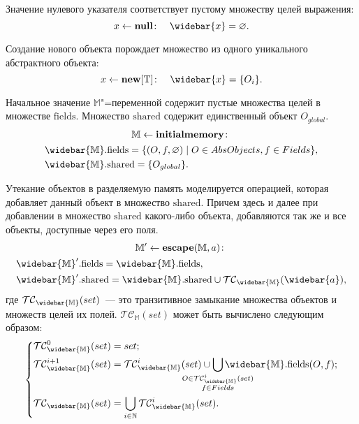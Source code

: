 \documentclass[14pt,titlepage,draft]{extarticle}
\newcommand{\M}{\ensuremath{\mathbb{M}}}
\newcommand{\Ms}{\ensuremath{\mathbb{\widebar{M}}}}
\newcommand{\Mf}[1]{\ensuremath{\mathrm{#1}}}
\newcommand{\type}[1]{\mathrm{#1}}
\newcommand{\op}[1]{\mathbf{#1}}
\newcommand{\pts}[1]{\widebar{#1}}
\newcommand{\AO}{O}
\newcommand{\AOGlobal}{\AO_{global}}
\newcommand{\TClosure}{\mathcal{TC}}
\begin{document}
    Значение нулевого указателя соответствует пустому множеству целей
    выражения:
    \[
      x \gets \op{null} \colon \quad
      \pts{x} = \emptyset.
    \]

    Создание нового объекта порождает множество из одного уникального
    абстрактного объекта:
    \[
      x \gets \op{new}[\type{T}] \colon \quad
      \pts{x} = \{\AO_i\}.
    \]

    Начальное значение \M"=переменной содержит пустые множества целей в
    множестве \Mf{fields}. Множество \Mf{shared}
    содержит единственный объект $\AOGlobal$.
    \begin{gather*}
      \M \gets \op{initialmemory} \colon \\
      \begin{aligned}
        &\Ms.\Mf{fields} = \{ (\AO, f, \emptyset) \mid
          \AO \in AbsObjects, f \in Fields \}, \\
        &\Ms.\Mf{shared} = \{\AOGlobal\}.
      \end{aligned}
    \end{gather*}

    Утекание объектов в разделяемую память моделируется операцией, которая
    добавляет данный объект в множество \Mf{shared}. Причем здесь и далее
    при добавлении в множество \Mf{shared} какого-либо объекта, добавляются
    так же и все объекты, доступные через его поля.
    \begin{gather*}
      \M' \gets \op{escape}(\M, a) \colon \\
      \begin{aligned}
        &\Ms'.\Mf{fields} = \Ms.\Mf{fields}, \\
        &\Ms'.\Mf{shared} = \Ms.\Mf{shared} \cup \TClosure_\Ms(\pts{a}),
      \end{aligned}
    \end{gather*}
    где $\TClosure_\Ms(set)$~--- это транзитивное замыкание  множества объектов и множеств целей их полей.
    $\TClosure_\M(set)$ может быть вычислено следующим образом:
    \[\left\{\begin{aligned}
      &\TClosure_\Ms^0(set) = set; \\
      &\TClosure_\Ms^{i+1}(set) = \TClosure_\Ms^i(set) \cup
        \smashoperator{\bigcup_{\substack{\AO \in \TClosure_\Ms^i(set)\\
                           f \in Fields}}}
          \Ms.\Mf{fields}(\AO, f); \\
      &\TClosure_\Ms(set) =
        \bigcup_{i \in \mathbb{N}} \TClosure_\Ms^i(set).
    \end{aligned}\right.\]
\end{document}
